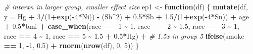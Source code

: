 \documentclass[12pt, twoside]{amherstthesis}
\newenvironment{Shaded}{\begin{snugshade}}{\end{snugshade}}
\newcommand{\AttributeTok}[1]{\textcolor[rgb]{0.13,0.29,0.53}{#1}}
\newcommand{\CommentTok}[1]{\textcolor[rgb]{0.56,0.35,0.01}{\textit{#1}}}
\newcommand{\ControlFlowTok}[1]{\textcolor[rgb]{0.13,0.29,0.53}{\textbf{#1}}}
\newcommand{\DecValTok}[1]{\textcolor[rgb]{0.00,0.00,0.81}{#1}}
\newcommand{\FloatTok}[1]{\textcolor[rgb]{0.00,0.00,0.81}{#1}}
\newcommand{\FunctionTok}[1]{\textcolor[rgb]{0.13,0.29,0.53}{\textbf{#1}}}
\newcommand{\NormalTok}[1]{#1}
\newcommand{\OtherTok}[1]{\textcolor[rgb]{0.56,0.35,0.01}{#1}}
\newcommand{\SpecialCharTok}[1]{\textcolor[rgb]{0.81,0.36,0.00}{\textbf{#1}}}
\begin{document}
\begin{Shaded}
\begin{Highlighting}[]
\CommentTok{\# interxn in larger group, smaller effect size}
\NormalTok{ep1 }\OtherTok{\textless{}{-}} \ControlFlowTok{function}\NormalTok{(df) \{}
  \FunctionTok{mutate}\NormalTok{(df, }\AttributeTok{y =} 
\NormalTok{           Hg }\SpecialCharTok{+} \DecValTok{3}\SpecialCharTok{/}\NormalTok{(}\DecValTok{1}\SpecialCharTok{+}\FunctionTok{exp}\NormalTok{(}\SpecialCharTok{{-}}\DecValTok{4}\SpecialCharTok{*}\NormalTok{Ni)) }\SpecialCharTok{{-}}\NormalTok{ (Sb}\SpecialCharTok{\^{}}\DecValTok{2}\NormalTok{) }\SpecialCharTok{+} \FloatTok{0.5}\SpecialCharTok{*}\NormalTok{Sb }\SpecialCharTok{+} \FloatTok{1.5}\SpecialCharTok{/}\NormalTok{(}\DecValTok{1}\SpecialCharTok{+}\FunctionTok{exp}\NormalTok{(}\SpecialCharTok{{-}}\DecValTok{4}\SpecialCharTok{*}\NormalTok{Sn)) }\SpecialCharTok{+} 
\NormalTok{           age }\SpecialCharTok{+} \FloatTok{0.5}\SpecialCharTok{*}\NormalTok{bmi }\SpecialCharTok{+} 
           \FunctionTok{case\_when}\NormalTok{(race }\SpecialCharTok{==} \DecValTok{1} \SpecialCharTok{\textasciitilde{}} \DecValTok{1}\NormalTok{, }
\NormalTok{                     race }\SpecialCharTok{==} \DecValTok{2} \SpecialCharTok{\textasciitilde{}} \FloatTok{1.5}\NormalTok{, }
\NormalTok{                     race }\SpecialCharTok{==} \DecValTok{3} \SpecialCharTok{\textasciitilde{}} \DecValTok{1}\NormalTok{, }
\NormalTok{                     race }\SpecialCharTok{==} \DecValTok{4} \SpecialCharTok{\textasciitilde{}} \DecValTok{1}\NormalTok{, }
\NormalTok{                     race }\SpecialCharTok{==} \DecValTok{5} \SpecialCharTok{\textasciitilde{}} \FloatTok{1.5} \SpecialCharTok{+} \FloatTok{0.5}\SpecialCharTok{*}\NormalTok{Hg) }\SpecialCharTok{+} \CommentTok{\# 1.5x in group 5}
           \FunctionTok{ifelse}\NormalTok{(smoke }\SpecialCharTok{==} \DecValTok{1}\NormalTok{, }\SpecialCharTok{{-}}\DecValTok{1}\NormalTok{, }\FloatTok{0.5}\NormalTok{) }\SpecialCharTok{+}
           \FunctionTok{rnorm}\NormalTok{(}\FunctionTok{nrow}\NormalTok{(df), }\DecValTok{0}\NormalTok{, }\DecValTok{5}\NormalTok{))}
\NormalTok{\}}


\end{Highlighting}
\end{Shaded}
\end{document}
